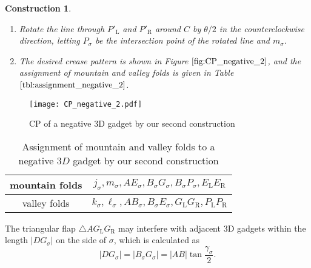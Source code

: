\documentclass[11pt]{amsart}
\newtheorem{construction}[theorem]{Construction}
\numberwithin{equation}{section}
\numberwithin{theorem}{section}
\newcommand{\Lt}{\ensuremath{\mathrm{L}}}
\newcommand{\Rt}{\ensuremath{\mathrm{R}}}
\newcommand{\norm}[1]{\ensuremath{\left| #1 \right|}}
\begin{document}
\begin{construction}
\begin{enumerate}[(1)]
Also draw a perpendicular through $C$ to $AC$, letting $P'_\sigma$ be the intersection point of the perpendicular and $m_\sigma$.
\item Rotate the line through $P'_\Lt$ and $P'_\Rt$ around $C$ by $\theta /2$ in the counterclockwise direction, 
letting $P_\sigma$ be the intersection point of the rotated line and $m_\sigma$.
\item The desired crease pattern is shown in Figure $\ref{fig:CP_negative_2}$,
and the assignment of mountain and valley folds is given in Table $\ref{tbl:assignment_negative_2}$.
\end{enumerate}
\end{construction}
\begin{figure}[htbp]
\addtocounter{theorem}{1}
\centering\texttt{[image: CP\_negative\_2.pdf]}
    \caption{CP of a negative $3$D gadget by our second construction}
    \label{fig:CP_negative_2}
\end{figure}
\addtocounter{theorem}{1}
\begin{table}[h]
\begin{tabular}{c|c}
mountain folds&$j_\sigma ,m_\sigma ,AE_\sigma ,B_\sigma G_\sigma ,B_\sigma P_\sigma ,E_\Lt E_\Rt$\\ \hline
valley folds&$k_\sigma ,\ell_\sigma ,AB_\sigma ,B_\sigma E_\sigma ,G_\Lt G_\Rt ,P_\Lt P_\Rt$
\end{tabular}\vspace{0.5cm}
\caption{Assignment of mountain and valley folds to a negative $3D$ gadget by our second construction}
\label{tbl:assignment_negative_2}
\end{table}
The triangular flap $\triangle AG_\Lt G_\Rt$ may interfere with adjacent $3$D gadgets within the length
$\norm{DG_\sigma}$ on the side of $\sigma$, which is calculated as
\begin{equation*}
\norm{DG_\sigma}=\norm{B_\sigma G_\sigma}=\norm{AB}\tan\frac{\gamma_\sigma}{2}.
\end{equation*}
\end{document}

